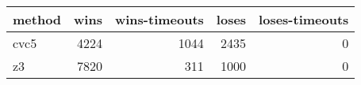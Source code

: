 \begin{tabular}{lrrrr}
\hline
 method   &   wins &   wins-timeouts &   loses &   loses-timeouts \\
\hline
 cvc5     &   4224 &            1044 &    2435 &                0 \\
 z3       &   7820 &             311 &    1000 &                0 \\
\hline
\end{tabular}
